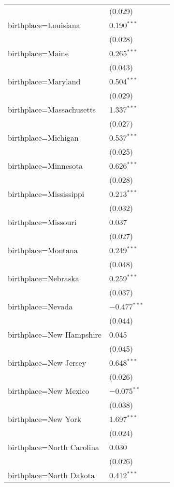 \begin{longtable}{ll|rrr}
        & (0.029) &  \\ 
        birthplace=Louisiana & 0.190$^{***}$ &  \\ 
        & (0.028) &  \\ 
        birthplace=Maine & 0.265$^{***}$ &  \\ 
        & (0.043) &  \\ 
        birthplace=Maryland & 0.504$^{***}$ &  \\ 
        & (0.029) &  \\ 
        birthplace=Massachusetts & 1.337$^{***}$ &  \\ 
        & (0.027) &  \\ 
        birthplace=Michigan & 0.537$^{***}$ &  \\ 
        & (0.025) &  \\ 
        birthplace=Minnesota & 0.626$^{***}$ &  \\ 
        & (0.028) &  \\ 
        birthplace=Mississippi & 0.213$^{***}$ &  \\ 
        & (0.032) &  \\ 
        birthplace=Missouri & 0.037 &  \\ 
        & (0.027) &  \\ 
        birthplace=Montana & 0.249$^{***}$ &  \\ 
        & (0.048) &  \\ 
        birthplace=Nebraska & 0.259$^{***}$ &  \\ 
        & (0.037) &  \\ 
        birthplace=Nevada & $-$0.477$^{***}$ &  \\ 
        & (0.044) &  \\ 
        birthplace=New Hampshire & 0.045 &  \\ 
        & (0.045) &  \\ 
        birthplace=New Jersey & 0.648$^{***}$ &  \\ 
        & (0.026) &  \\ 
        birthplace=New Mexico & $-$0.075$^{**}$ &  \\ 
        & (0.038) &  \\ 
        birthplace=New York & 1.697$^{***}$ &  \\ 
        & (0.024) &  \\ 
        birthplace=North Carolina & 0.030 &  \\ 
        & (0.026) &  \\ 
        birthplace=North Dakota & 0.412$^{***}$ &  \\ 

\end{longtable}
